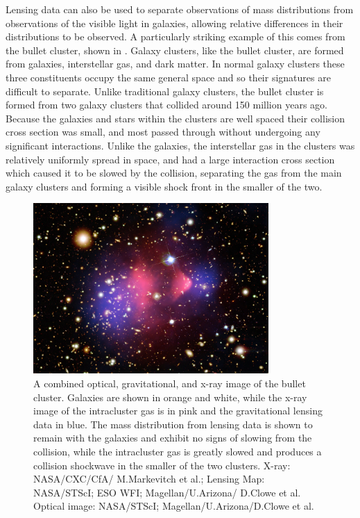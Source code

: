 Lensing data can also be used to separate observations of mass distributions from observations of the visible light in galaxies, allowing relative differences in their distributions to be observed. 
A particularly striking example of this comes from the bullet cluster, shown in . 
Galaxy clusters, like the bullet cluster, are formed from galaxies, interstellar gas, and dark matter.
In normal galaxy clusters these three constituents occupy the same general space and so their signatures are difficult to separate.
Unlike traditional galaxy clusters, the bullet cluster is formed from two galaxy clusters that collided around 150 million years ago. 
Because the galaxies and stars within the clusters are well spaced their collision cross section was small, and most passed through without undergoing any significant interactions.
Unlike the galaxies, the interstellar gas in the clusters was relatively uniformly spread in space, and had a large interaction cross section which caused it to be slowed by the collision, separating the gas from the main galaxy clusters and forming a visible shock front in the smaller of the two.

\begin{figure}[htpb]
	\label{fig:bullet}
	\centering
	\includegraphics[width=0.8\textwidth]{figures/bullet_cluster.jpg}
	\caption[Visible, x-ray, and gravitational lensing images of the bullet cluster]{ A combined optical, gravitational, and x-ray image of the bullet cluster. Galaxies are shown in orange and white, while the x-ray image of the intracluster gas is in pink and the gravitational lensing data in blue. The mass distribution from lensing data is shown to remain with the galaxies and exhibit no signs of slowing from the collision, while the intracluster gas is greatly slowed and produces a collision shockwave in the smaller of the two clusters. X-ray: NASA/CXC/CfA/ M.Markevitch et al.; Lensing Map: NASA/STScI; ESO WFI; Magellan/U.Arizona/ D.Clowe et al. Optical image: NASA/STScI; Magellan/U.Arizona/D.Clowe et al.}
\end{figure}

